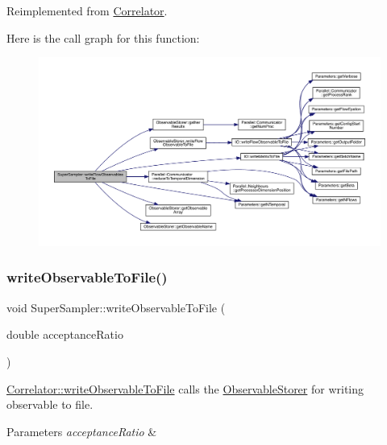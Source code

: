 Reimplemented from \mbox{\hyperlink{class_correlator_a168512b2ce182d9478db47f100125fa6}{Correlator}}.

Here is the call graph for this function\+:
\nopagebreak
\begin{figure}[H]
\begin{center}
\leavevmode
\includegraphics[width=350pt]{class_super_sampler_a410b650ebccdb03519c88908a3a8013e_cgraph}
\end{center}
\end{figure}
\mbox{\label{class_super_sampler_a05b42b82879233dc329d280a61bfd7f0}} 
\subsubsection{\texorpdfstring{writeObservableToFile()}{writeObservableToFile()}}
{\footnotesize\ttfamily void Super\+Sampler\+::write\+Observable\+To\+File (\begin{DoxyParamCaption}\item[{double}]{acceptance\+Ratio }\end{DoxyParamCaption})\hspace{0.3cm}{\ttfamily [virtual]}}



\mbox{\hyperlink{class_correlator_a9e8d80e30e4fbe3b7fe57521538cb5ff}{Correlator\+::write\+Observable\+To\+File}} calls the \mbox{\hyperlink{class_observable_storer}{Observable\+Storer}} for writing observable to file. 


\begin{DoxyParams}{Parameters}
{\em acceptance\+Ratio} & \\
\hline
\end{DoxyParams}


